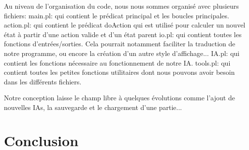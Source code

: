 \documentclass[]{article}
\begin{document}
Au niveau de l'organisation du code, nous nous sommes organisé avec plusieurs fichiers:
	main.pl:		qui contient le prédicat principal et les boucles principales.
	action.pl:		qui contient le prédicat doAction qui est utilisé pour calculer un nouvel état à partir d'une action valide et d'un état parent
	io.pl:			qui contient toutes les fonctions d'entrées/sorties. Cela pourrait notamment faciliter la traduction de notre programme, ou encore la création d'un autre style d'affichage...
	IA.pl:			qui contient les fonctions nécessaire au fonctionnement de notre IA.
	tools.pl:		qui contient toutes les petites fonctions utilitaires dont nous pouvons avoir besoin dans les différents fichiers.
	
Notre conception laisse le champ libre à quelques évolutions comme l'ajout de nouvelles IAs, la sauvegarde et le chargement d'une partie... 

\section{Conclusion}
\end{document}
